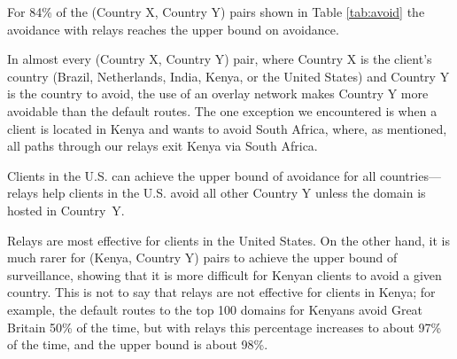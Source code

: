 \begin{finding}
For 84\% of the (Country X, Country Y) pairs shown in Table \ref{tab:avoid} the avoidance with relays reaches the upper bound on avoidance. 
\end{finding}
\noindent
In almost every (Country X, Country Y) pair, where Country X is the
client's country (Brazil, Netherlands, India, Kenya, or the United
States) and Country Y is the country to avoid, the use of an overlay
network makes Country Y more avoidable than the default routes.  The one
exception we encountered is when a client is located in Kenya and wants
to avoid South Africa, where, as mentioned, all paths through our
relays exit Kenya via South Africa.

\begin{finding}
Clients in the U.S. can achieve the upper bound of avoidance for all
countries---relays help clients in
the U.S. avoid all other Country Y unless the domain is hosted in Country~Y.  
\end{finding}
\noindent
Relays are most effective for clients in the United States.  On the other hand, it is much rarer for (Kenya, Country Y) pairs to achieve the upper bound of surveillance, showing that it is more difficult for Kenyan clients to avoid a given country.  This is not to say that relays are not effective for clients in Kenya; for example, the default routes to the top 100 domains for Kenyans avoid Great Britain 50\% of the time, but with relays this percentage increases to about 97\% of the time, and the upper bound is about 98\%. 

